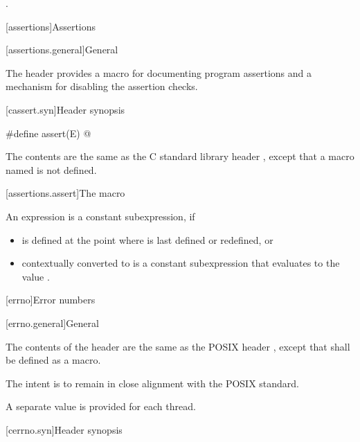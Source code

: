 \begin{itemdescr}
\pnum
\ensures
{}.
\end{itemdescr}

[assertions]{Assertions}

[assertions.general]{General}

\pnum
The header 
provides a macro for documenting \Cpp{} program assertions and a mechanism
for disabling the assertion checks.

[cassert.syn]{Header  synopsis}

%
\begin{codeblock}
#define assert(E) @\seebelow@
\end{codeblock}

\pnum
{}%
The contents are the same as the C standard library header
,
except that a macro named 
is not defined.


[assertions.assert]{The  macro}

\pnum
An expression 
is a constant subexpression, if
\begin{itemize}
\item
{} is defined at the point where 
is last defined or redefined, or
\item
{} contextually converted to 
is a constant subexpression that evaluates to the value .
\end{itemize}

[errno]{Error numbers}

[errno.general]{General}

\pnum
The contents of the header  are the same as the POSIX header
, except that  shall be defined as a macro.
\begin{note}
The intent is to remain in close alignment with the POSIX standard.
\end{note}
A separate  value is provided for each thread.

[cerrno.syn]{Header  synopsis}

